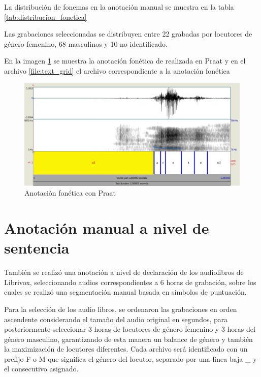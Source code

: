 \documentclass[a4paper,12pt,twoside]{report}
\begin{document}


La distribución de fonemas en la anotación manual se muestra en la tabla \ref{tab:distribucion_fonetica}



Las grabaciones seleccionadas se distribuyen entre 22 grabadas por locutores de género femenino, 68 masculinos y 10 no identificado.

En la imagen \ref{img:anotacion_fonetica_praat} se muestra la anotación fonética de realizada en Praat y en el archivo \ref{file:text_grid} el archivo correspondiente a la anotación fonética



\begin{figure}[H]
\caption{Anotación fonética con Praat}
\label{img:anotacion_fonetica_praat}
\includegraphics[width=\textwidth]{imagenes/03_01_anotacion_fonetica.png}
\end{figure}





\section{Anotación manual a nivel de sentencia}

También se realizó una anotación a nivel de declaración de los audiolibros de Librivox, seleccionando audios correspondientes a 6 horas de grabación, sobre los cuales se realizó una segmentación manual basada en símbolos de puntuación.

Para la selección de los audio libros, se ordenaron las grabaciones en orden ascendente considerando el tamaño del audio original en segundos, para posteriormente seleccionar 3 horas de locutores de género femenino y 3 horas del género masculino, garantizando de esta manera un balance de género y también la maximización de locutores diferentes. Cada archivo será identificado con un prefijo F o M que significa el género del locutor, separado por una línea baja \_ y el consecutivo asignado.
\end{document}
